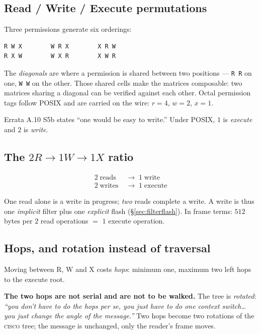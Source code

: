 \documentclass[11pt,a4paper]{article}
\newcommand{\CISCO}{\textsc{cisco}}
\begin{document}
\subsection{Read / Write / Execute permutations}

Three permissions generate six orderings:

\begin{Verbatim}[fontsize=\small,frame=single]
R W X        W R X        X R W
R X W        W X R        X W R
\end{Verbatim}

The \emph{diagonals} are where a permission is shared between two positions ---
\texttt{R R} on one, \texttt{W W} on the other. Those shared cells make the
matrices composable: two matrices sharing a diagonal can be verified against
each other. Octal permission tags follow POSIX and are carried on the wire:
$r = 4$, $w = 2$, $x = 1$.

\begin{errata}{Errata A.10}
S5b states ``one would be easy to write.'' Under POSIX, $1$ is \emph{execute}
and $2$ is \emph{write}.
\end{errata}

\subsection{The $2R \rightarrow 1W \rightarrow 1X$ ratio}
\label{sec:ratio}

\begin{align*}
2 \;\text{reads} &\;\rightarrow\; 1 \;\text{write} \\
2 \;\text{writes} &\;\rightarrow\; 1 \;\text{execute}
\end{align*}

One read alone is a write in progress; \emph{two} reads complete a write. A
write is thus one \emph{implicit} filter plus one \emph{explicit} flash
(\S\ref{sec:filterflash}). In frame terms: $512$ bytes per $2$ read operations
$=$ $1$ execute operation.

\subsection{Hops, and rotation instead of traversal}

Moving between R, W and X costs \emph{hops}: minimum one, maximum two left hops
to the execute root.

\begin{ruleblock}
\textbf{The two hops are not serial and are not to be walked.} The tree is
\emph{rotated}: \emph{``you don't have to do the hops per se, you just have to
do one context switch\dots{} you just change the angle of the message.''} Two
hops become two rotations of the \CISCO{} tree; the message is unchanged, only
the reader's frame moves.
\end{ruleblock}
\end{document}
